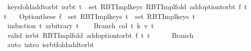 \begin{isabellebody}
\endisatagproof
{\isafoldproof}%
%
\isadelimproof
\isanewline
%
\endisadelimproof
\isanewline
{}\isamarkupfalse%
\ keys{\isacharunderscore}{\kern0pt}fold{\isacharunderscore}{\kern0pt}add{\isacharunderscore}{\kern0pt}to{\isacharunderscore}{\kern0pt}rbt{\isacharcolon}{\kern0pt}\ {\isachardoublequoteopen}is{\isacharunderscore}{\kern0pt}rbt\ t{\isacharprime}{\kern0pt}\ {\isasymLongrightarrow}\ set\ {\isacharparenleft}{\kern0pt}RBT{\isacharunderscore}{\kern0pt}Impl{\isachardot}{\kern0pt}keys\ {\isacharparenleft}{\kern0pt}RBT{\isacharunderscore}{\kern0pt}Impl{\isachardot}{\kern0pt}fold\ {\isacharparenleft}{\kern0pt}add{\isacharunderscore}{\kern0pt}option{\isacharunderscore}{\kern0pt}to{\isacharunderscore}{\kern0pt}rbt\ f{\isacharparenright}{\kern0pt}\ t\ t{\isacharprime}{\kern0pt}{\isacharparenright}{\kern0pt}{\isacharparenright}{\kern0pt}\ {\isacharequal}{\kern0pt}\isanewline
\ \ Option{\isachardot}{\kern0pt}these\ {\isacharparenleft}{\kern0pt}f\ {\isacharbackquote}{\kern0pt}\ set\ {\isacharparenleft}{\kern0pt}RBT{\isacharunderscore}{\kern0pt}Impl{\isachardot}{\kern0pt}keys\ t{\isacharparenright}{\kern0pt}{\isacharparenright}{\kern0pt}\ {\isasymunion}\ set\ {\isacharparenleft}{\kern0pt}RBT{\isacharunderscore}{\kern0pt}Impl{\isachardot}{\kern0pt}keys\ t{\isacharprime}{\kern0pt}{\isacharparenright}{\kern0pt}{\isachardoublequoteclose}\isanewline
%
\isadelimproof
%
\endisadelimproof
%
\isatagproof
{}\isamarkupfalse%
\ {\isacharparenleft}{\kern0pt}induction\ t\ arbitrary{\isacharcolon}{\kern0pt}\ t{\isacharprime}{\kern0pt}{\isacharparenright}{\kern0pt}\isanewline
\ \ \isamarkupfalse%
\ {\isacharparenleft}{\kern0pt}Branch\ col\ t{}\ k\ v\ t{}{\isacharparenright}{\kern0pt}\isanewline
\ \ \isamarkupfalse%
\ valid{\isacharcolon}{\kern0pt}\ {\isachardoublequoteopen}is{\isacharunderscore}{\kern0pt}rbt\ {\isacharparenleft}{\kern0pt}RBT{\isacharunderscore}{\kern0pt}Impl{\isachardot}{\kern0pt}fold\ {\isacharparenleft}{\kern0pt}add{\isacharunderscore}{\kern0pt}option{\isacharunderscore}{\kern0pt}to{\isacharunderscore}{\kern0pt}rbt\ f{\isacharparenright}{\kern0pt}\ t{}\ t{\isacharprime}{\kern0pt}{\isacharparenright}{\kern0pt}{\isachardoublequoteclose}\isanewline
\ \ \ \ \isamarkupfalse%
\ Branch{\isacharparenleft}{\kern0pt}{}{\isacharparenright}{\kern0pt}\isanewline
\ \ \ \ \isamarkupfalse%
\ {\isacharparenleft}{\kern0pt}auto\ intro{\isacharcolon}{\kern0pt}\ is{\isacharunderscore}{\kern0pt}rbt{\isacharunderscore}{\kern0pt}fold{\isacharunderscore}{\kern0pt}add{\isacharunderscore}{\kern0pt}to{\isacharunderscore}{\kern0pt}rbt{\isacharparenright}{\kern0pt}\isanewline

\end{isabellebody}
